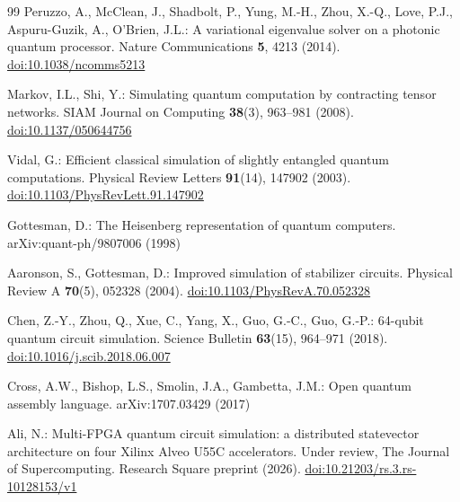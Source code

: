 \documentclass[pdflatex,sn-mathphys-num]{sn-jnl}
\providecommand{\doi}[1]{\href{https://doi.org/#1}{doi:#1}}
\theoremstyle{thmstyleone}
\theoremstyle{thmstylethree}
\begin{document}
\begin{thebibliography}{99}
Peruzzo, A., McClean, J., Shadbolt, P., Yung, M.-H., Zhou, X.-Q., Love, P.J., Aspuru-Guzik, A., O'Brien, J.L.: A variational eigenvalue solver on a photonic quantum processor. Nature Communications \textbf{5}, 4213 (2014). \doi{10.1038/ncomms5213}

Markov, I.L., Shi, Y.: Simulating quantum computation by contracting tensor networks. SIAM Journal on Computing \textbf{38}(3), 963--981 (2008). \doi{10.1137/050644756}

Vidal, G.: Efficient classical simulation of slightly entangled quantum computations. Physical Review Letters \textbf{91}(14), 147902 (2003). \doi{10.1103/PhysRevLett.91.147902}

Gottesman, D.: The Heisenberg representation of quantum computers. arXiv:quant-ph/9807006 (1998)

Aaronson, S., Gottesman, D.: Improved simulation of stabilizer circuits. Physical Review A \textbf{70}(5), 052328 (2004). \doi{10.1103/PhysRevA.70.052328}

Chen, Z.-Y., Zhou, Q., Xue, C., Yang, X., Guo, G.-C., Guo, G.-P.: 64-qubit quantum circuit simulation. Science Bulletin \textbf{63}(15), 964--971 (2018). \doi{10.1016/j.scib.2018.06.007}

Cross, A.W., Bishop, L.S., Smolin, J.A., Gambetta, J.M.: Open quantum assembly language. arXiv:1707.03429 (2017)

Ali, N.: Multi-FPGA quantum circuit simulation: a distributed statevector architecture on four Xilinx Alveo U55C accelerators. Under review, The Journal of Supercomputing. Research Square preprint (2026). \doi{10.21203/rs.3.rs-10128153/v1}

\end{thebibliography}
\end{document}
